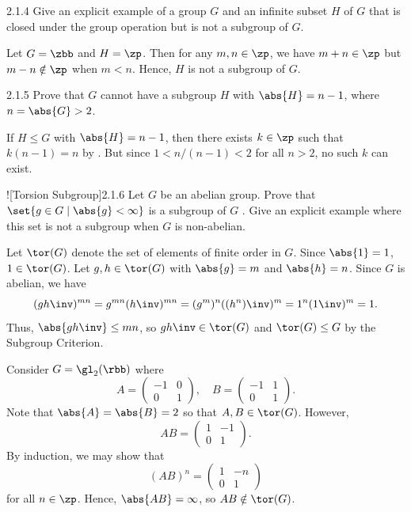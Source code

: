 \begin{exercise}{2.1.4}
    Give an explicit example of a group $G$ and an infinite subset $H$ of $G$ that is closed under the group operation but is not a subgroup of $G$.
\end{exercise}

\begin{sol}
    Let $G = \zbb$ and $H = \zp$.
	Then for any $m, n \in \zp$, we have $m + n \in \zp$ but $m - n \notin \zp$ when $m < n$.
	Hence, $H$ is not a subgroup of $G$.
\end{sol}

\begin{exercise}{2.1.5}
    Prove that $G$ cannot have a subgroup $H$ with $\abs{H} = n - 1$, where $n = \abs{G} > 2$.
\end{exercise}

\begin{sol}
   If $H \leq G$ with $\abs{H} = n - 1$, then there exists $k \in \zp$ such that $k(n - 1) = n$ by .
   But since $1 < n/(n - 1) < 2$ for all $n > 2$, no such $k$ can exist.
\end{sol}

\begin{exercise}![Torsion Subgroup]{2.1.6}
    Let $G$ be an abelian group.
	Prove that $\set{g \in G \mid \abs{g} < \infty}$ is a subgroup of $G$ .
	Give an explicit example where this set is not a subgroup when $G$ is non-abelian.
\end{exercise}

\begin{sol}
    Let $\tor(G)$ denote the set of elements of finite order in $G$.
	Since $\abs{1} = 1$, $1 \in \tor(G)$.
	Let $g, h \in \tor(G)$ with $\abs{g} = m$ and $\abs{h} = n$.
    Since $G$ is abelian, we have
    \[
    	(gh\inv)^{mn} = g^{mn}(h\inv)^{mn} = (g^m)^n((h^n)\inv)^m = 1^n(1\inv)^m = 1.
    \]
    Thus, $\abs{gh\inv} \leq mn$, so $gh\inv \in \tor(G)$ and $\tor(G) \leq G$ by the Subgroup Criterion.

    Consider $G = \gl_2(\rbb)$ where
    \[
    	A = 
        \begin{pmatrix}
            -1 & 0 \\
            0 & 1
        \end{pmatrix}, \quad
        B = 
        \begin{pmatrix}
            -1 & 1 \\
            0 & 1
        \end{pmatrix}.
	\]
    Note that $\abs{A} = \abs{B} = 2$ so that $A, B \in \tor(G)$.
	However,
    \[
    	AB = 
        \begin{pmatrix}
            1 & -1 \\
            0 & 1
        \end{pmatrix}.
	\]
    By induction, we may show that
    \[
    	(AB)^n = 
        \begin{pmatrix}
            1 & -n \\
            0 & 1
        \end{pmatrix}
	\]
    for all $n \in \zp$.
	Hence, $\abs{AB} = \infty$, so $AB \notin \tor(G)$.
\end{sol}

